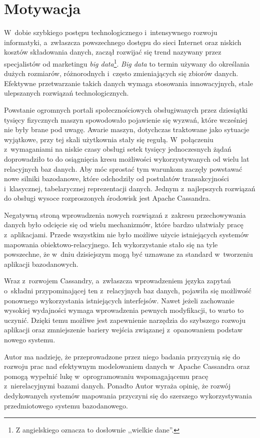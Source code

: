 \section{Motywacja}
\label{sec:motivation}

W~dobie szybkiego postępu technologicznego i~intensywnego rozwoju informatyki, a~zwłaszcza powszechnego dostępu do sieci Internet oraz niskich kosztów składowania danych, zaczął rozwijać się trend nazywany przez specjalistów od marketingu \emph{big data}\footnote{Z angielskiego oznacza to dosłownie ,,wielkie dane''.}. \emph{Big data} to termin używany do określania dużych rozmiarów, różnorodnych i~często zmieniających się zbiorów danych.~\cite{big_data_definition} Efektywne przetwarzanie takich danych wymaga stosowania innowacyjnych, stale ulepszanych rozwiązań technologicznych. 

Powstanie ogromnych portali społecznościowych obsługiwanych przez dziesiątki tysięcy fizycznych maszyn spowodowało pojawienie się wyzwań, które wcześniej nie były brane pod uwagę. Awarie maszyn, dotychczas traktowane jako sytuacje wyjątkowe, przy tej skali użytkownia stały się regułą. W~połączeniu z~wymaganiami na niskie czasy obsługi setek tysięcy jednoczesnych żądań doprowadziło to do osiągnięcia kresu możliwości wykorzystywanych od wielu lat relacyjnych baz danych. Aby móc sprostać tym warunkom zaczęły powstawać nowe silniki bazodanowe, które odchodziły od postulatów transakcyjności i~klasycznej, tabelarycznej reprezentacji danych. Jednym z~najlepszych rozwiązań do obsługi wysoce rozproszonych środowisk jest Apache Cassandra.

Negatywną stroną wprowadzenia nowych rozwiązań z~zakresu przechowywania danych było odcięcie się od wielu mechanizmów, które bardzo ułatwiały pracę z~aplikacjami. Przede wszystkim nie było możliwe użycie istniejących systemów mapowania obiektowo-relacyjnego. Ich wykorzystanie stało się na tyle powszechne, że w~dniu dzisiejszym mogą być uznawane za standard w~tworzeniu aplikacji bazodanowych.

Wraz z~rozwojem Cassandry, a~zwłaszcza wprowadzeniem języka zapytań o~składni przypominającej ten z~relacyjnych baz danych, pojawiła się możliwość ponownego wykorzystania istniejących interfejsów. Nawet jeżeli zachowanie wysokiej wydajności wymaga wprowadzenia pewnych modyfikacji, to warto to uczynić. Dzięki temu możliwe jest zapewnienie narzędzia do szybszego rozwoju aplikacji oraz zmniejszenie bariery wejścia związanej z~opanowaniem podstaw nowego systemu.

Autor ma nadzieję, że przeprowadzone przez niego badania przyczynią się do rozwoju prac nad efektywnym modelowaniem danych w~Apache Cassandra oraz pomogą wypełnić lukę w~oprogramowaniu wspomagającemu pracę z~nierelacyjnymi bazami danych. Ponadto Autor wyraża opinię, że rozwój dedykowanych systemów mapowania przyczyni się do szerszego wykorzystywania przedmiotowego systemu bazodanowego.

